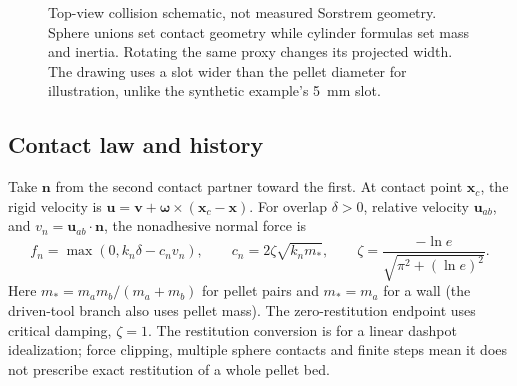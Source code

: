 \begin{figure}[htbp]
\centering
{}
\caption{Top-view collision schematic, not measured Sorstrem geometry. Sphere
unions set contact geometry while cylinder formulas set mass and inertia.
Rotating the same proxy changes its projected width. The drawing uses a slot
wider than the pellet diameter for illustration, unlike the synthetic example's
\SI{5}{mm} slot.}
\label{fig:slot}
\end{figure}

\subsection{Contact law and history}
Take $\mathbf{n}$ from the second contact partner toward the first. At contact
point $\mathbf{x}_c$, the rigid velocity is
$\mathbf{u}=\mathbf{v}+\boldsymbol\omega\times(\mathbf{x}_c-\mathbf{x})$.
For overlap $\delta>0$, relative velocity $\mathbf{u}_{ab}$, and
$v_n=\mathbf{u}_{ab}\cdot\mathbf{n}$, the nonadhesive normal force is
\begin{equation}
 f_n=\max(0,k_n\delta-c_n v_n),\qquad
 c_n=2\zeta\sqrt{k_n m_*},\qquad
 \zeta=\frac{-\ln e}{\sqrt{\pi^2+(\ln e)^2}}. \label{eq:normal-contact}
\end{equation}
Here $m_*=m_am_b/(m_a+m_b)$ for pellet pairs and $m_*=m_a$ for a wall
(the driven-tool branch also uses pellet mass). The zero-restitution endpoint
uses critical damping, $\zeta=1$. The restitution conversion is for a linear
dashpot idealization; force clipping, multiple sphere contacts and finite steps
mean it does not prescribe exact restitution of a whole pellet bed.

